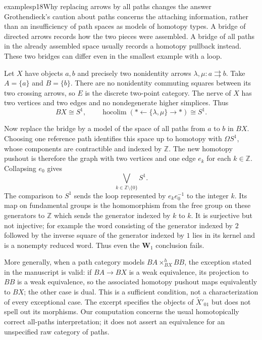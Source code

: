 \begin{dcomment}{examples}{p18}{Why replacing arrows by all paths changes the answer}
Grothendieck's caution about paths concerns the attaching information, rather than an insufficiency of path spaces as models of homotopy types. A bridge of directed arrows records how the two pieces were assembled. A bridge of all paths in the already assembled space usually records a homotopy pullback instead. These two bridges can differ even in the smallest example with a loop.

Let $X$ have objects $a,b$ and precisely two nonidentity arrows $\lambda,\mu:a\rightrightarrows b$. Take $A=\{a\}$ and $B=\{b\}$. There are no nonidentity commuting squares between its two crossing arrows, so $E$ is the discrete two-point category. The nerve of $X$ has two vertices and two edges and no nondegenerate higher simplices. Thus
\[
 BX\cong S^1,\qquad
 \operatorname{hocolim}(*\longleftarrow\{\lambda,\mu\}\longrightarrow*)
 \cong S^1.
\]

Now replace the bridge by a model of the space of all paths from $a$ to $b$ in $BX$. Choosing one reference path identifies this space up to homotopy with $\Omega S^1$, whose components are contractible and indexed by $\mathbb Z$. The new homotopy pushout is therefore the graph with two vertices and one edge $e_k$ for each $k\in\mathbb Z$. Collapsing $e_0$ gives
\[
 \bigvee_{k\in\mathbb Z\setminus\{0\}}S^1.
\]
The comparison to $S^1$ sends the loop represented by $e_ke_0^{-1}$ to the integer $k$. Its map on fundamental groups is the homomorphism from the free group on these generators to $\mathbb Z$ which sends the generator indexed by $k$ to $k$. It is surjective but not injective; for example the word consisting of the generator indexed by $2$ followed by the inverse square of the generator indexed by $1$ lies in its kernel and is a nonempty reduced word. Thus even the $\mathbf W_1$ conclusion fails.

More generally, when a path category models $BA\times^h_{BX}BB$, the exception stated in the manuscript is valid: if $BA\to BX$ is a weak equivalence, its projection to $BB$ is a weak equivalence, so the associated homotopy pushout maps equivalently to $BX$; the other case is dual. This is a sufficient condition, not a characterization of every exceptional case. The excerpt specifies the objects of $\widetilde X'_{01}$ but does not spell out its morphisms. Our computation concerns the usual homotopically correct all-paths interpretation; it does not assert an equivalence for an unspecified raw category of paths.
\end{dcomment}


